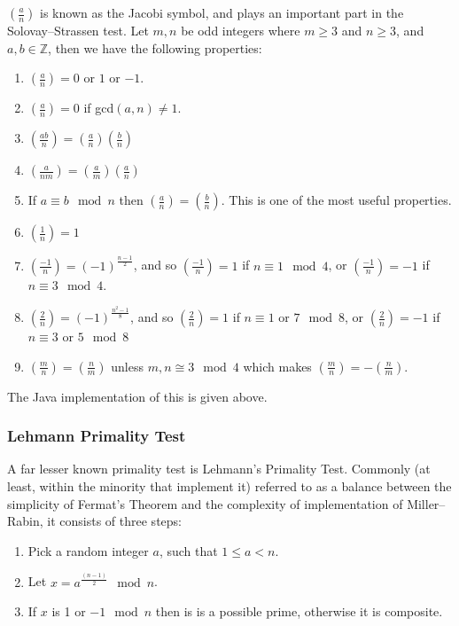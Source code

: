     \begin{mathdef}
      $(\frac{a}{n})$ is known as the Jacobi symbol, and plays an important part in the Solovay--Strassen test. Let $m,n$ be odd integers where $m \geq 3$ and $n \geq 3$, and $a,b \in \mathbb{Z}$, then we have the following properties\cite{Alfred-Menezes:1996kx}:
    
      \begin{enumerate}
        \item $(\frac{a}{n}) = 0$ or $1$ or $-1$.
        \item $(\frac{a}{n}) = 0$ if gcd$(a,n) \neq 1$.
        \item $(\frac{ab}{n}) = (\frac{a}{n}) (\frac{b}{n})$
        \item $(\frac{a}{nm}) = (\frac{a}{m}) (\frac{a}{n})$
        \item If $a \equiv b \mod{n}$ then $(\frac{a}{n}) = (\frac{b}{n})$. This is one of the most useful properties.
        \item $(\frac{1}{n}) = 1$
        \item $(\frac{-1}{n}) = (-1)^{\frac{n-1}{2}}$, and so $(\frac{-1}{n}) = 1$ if $n \equiv 1 \mod{4}$, or $(\frac{-1}{n}) = -1$ if $n \equiv 3 \mod{4}$.
        \item $(\frac{2}{n}) = (-1)^{\frac{n^2-1}{8}}$, and so $(\frac{2}{n}) = 1$ if $n \equiv 1 $ or $ 7 \mod{8}$, or $(\frac{2}{n}) = -1$ if $n \equiv 3 $ or $ 5 \mod{8}$
        \item $(\frac{m}{n}) = (\frac{n}{m})$ unless $m,n \cong 3 \mod{4}$ which makes $(\frac{m}{n}) = -(\frac{n}{m})$.
      \end{enumerate}
    
      The Java implementation of this is given above.
    \end{mathdef}
    
    \subsubsection{Lehmann Primality Test}
    
    A far lesser known primality test is Lehmann's Primality Test. Commonly (at least, within the minority that implement it) referred to as a balance between the simplicity of Fermat's Theorem and the complexity of implementation of Miller--Rabin, it consists of three steps:
    
    \begin{enumerate}
      \item Pick a random integer $a$, such that $1 \leq a < n$.
      \item Let $x = a^{\frac{(n-1)}{2}} \mod n$.
      \item If $x$ is 1 or $-1 \mod n$ then is is a possible prime, otherwise it is composite.
    \end{enumerate}
    
